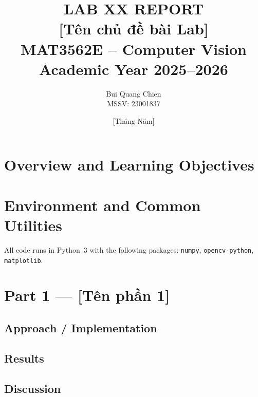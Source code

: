 \documentclass[12pt,a4paper]{article}
\title{%
  \textbf{LAB XX REPORT}\\[0.4em]
  \large [Tên chủ đề bài Lab] \\[0.8em]
  \normalsize MAT3562E -- Computer Vision\\
  Academic Year 2025--2026
}
\author{
  Bui Quang Chien\\
  MSSV: 23001837
}
\date{[Tháng Năm]}
\begin{document}
\maketitle
\tableofcontents
\newpage

\section{Overview and Learning Objectives}


\section{Environment and Common Utilities}

All code runs in Python~3 with the following packages:
\texttt{numpy}, \texttt{opencv-python}, \texttt{matplotlib}.


\section{Part 1 --- [Tên phần 1]}

\subsection{Approach / Implementation}

\subsection{Results}

\subsection{Discussion}
\end{document}
